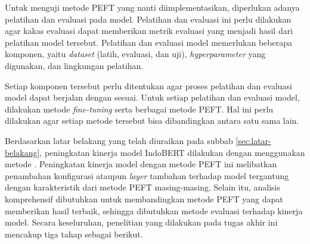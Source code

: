 Untuk menguji metode PEFT yang nanti  diimplementasikan, diperlukan adanya pelatihan dan evaluasi pada model. Pelatihan dan evaluasi ini perlu dilakukan agar kakas evaluasi dapat memberikan metrik evaluasi yang menjadi hasil dari pelatihan model tersebut. Pelatihan dan evaluasi model memerlukan beberapa komponen, yaitu \textit{dataset} (latih, evaluasi, dan uji), \textit{hyperparameter} yang digunakan, dan lingkungan pelatihan.

Setiap komponen tersebut perlu ditentukan agar proses pelatihan dan evaluasi model dapat berjalan dengan sesuai. Untuk setiap pelatihan dan evaluasi model, dilakukan metode \textit{fine-tuning} serta berbagai metode PEFT. Hal ini perlu dilakukan agar setiap metode tersebut bisa dibandingkan antara satu sama lain.


Berdasarkan latar belakang yang telah diuraikan pada subbab \ref{sec:latar-belakang}, peningkatan kinerja model IndoBERT dilakukan dengan menggunakan metode \PEFT. Peningkatan kinerja model dengan metode PEFT ini melibatkan penambahan konfigurasi ataupun \textit{layer} tambahan terhadap model tergantung dengan karakteristik dari metode PEFT masing-masing. Selain itu, analisis komprehensif dibutuhkan untuk membandingkan metode PEFT yang dapat memberikan hasil terbaik, sehingga dibutuhkan metode evaluasi terhadap kinerja model. Secara keseluruhan, penelitian yang dilakukan pada tugas akhir ini mencakup tiga tahap sebagai berikut.

